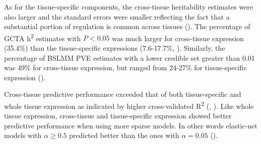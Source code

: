 \documentclass[10pt,letterpaper]{article}
\begin{document}
As for the tissue-specific components, 
the cross-tissue heritability estimates were also larger and the standard errors were smaller reflecting the fact that a substantial portion of regulation is common across tissues (). The percentage of GCTA h\textsuperscript{2} estimates with $P < 0.05$ was much larger for cross-tissue expression (35.4\%) than the tissue-specific expressions (7.6-17.7\%, ). Similarly, the percentage of BSLMM PVE estimates with a lower credible set greater than 0.01 was 49\% for cross-tissue expression, but ranged from 24-27\% for tissue-specific expression ().


Cross-tissue predictive performance exceeded that of both tissue-specific and whole tissue expression as indicated by higher cross-validated R\textsuperscript{2} (, ). Like whole tissue expression, cross-tissue and tissue-specific expression showed better predictive performance when using more sparse models. In other words elastic-net models with \(\alpha \geq 0.5\) predicted better than the ones with \(\alpha=0.05\) (). 


\end{document}
